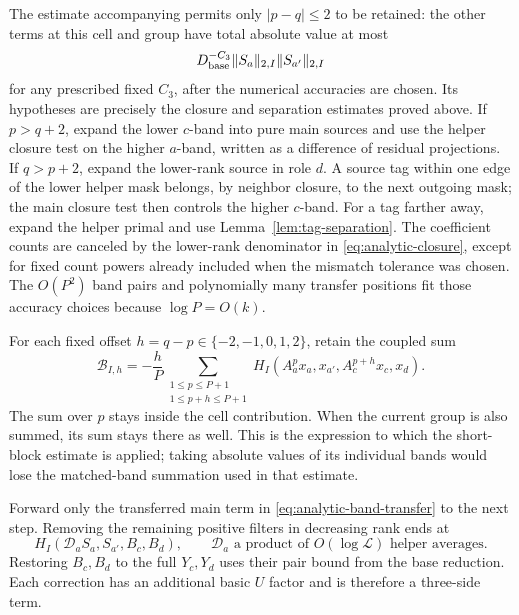 The estimate accompanying \cite[Lemma~6.9]{H} permits only
\(|p-q|\le2\) to be retained: the other terms at this cell and
group have total absolute value at most
\[
 D_{\rm base}^{-C_3}
       \lVert S_a\rVert_{2,I}\lVert S_{a'}\rVert_{2,I}
\]
for any prescribed fixed \(C_3\), after the numerical accuracies
are chosen.  Its hypotheses are precisely the closure and
separation estimates proved above.  If \(p>q+2\), expand the
lower \(c\)-band into pure main sources and use the helper
closure test on the higher \(a\)-band, written as a difference
of residual projections.  If \(q>p+2\), expand the lower-rank
source in role \(d\).  A source tag within one edge of the
lower helper mask belongs, by neighbor closure, to the next
outgoing mask; the main closure test then controls the higher
\(c\)-band.  For a tag farther away, expand the helper primal
and use Lemma~\ref{lem:tag-separation}.  The coefficient counts
are canceled by the lower-rank denominator in
\eqref{eq:analytic-closure}, except for fixed count powers
already included when the mismatch tolerance was chosen.
The \(O(P^2)\) band pairs and polynomially many transfer
positions fit those accuracy choices because \(\log P=O(k)\).

For each fixed offset \(h=q-p\in\{-2,-1,0,1,2\}\), retain the
coupled sum
\begin{equation}
 \mathcal B_{I,h}
    =-\frac hP
       \sum_{\substack{1\le p\le P+1\\1\le p+h\le P+1}}
          H_I(A_a^px_a,x_{a'},A_c^{p+h}x_c,x_d).
 \label{eq:analytic-retained-bands}
\end{equation}
The sum over \(p\) stays inside the cell contribution.  When the
current group is also summed, its sum stays there as well.
This is the expression to which the short-block estimate is
applied; taking absolute values of its individual bands would
lose the matched-band summation used in that estimate.

Forward only the transferred main term in
\eqref{eq:analytic-band-transfer} to the next step.  Removing
the remaining positive filters in decreasing rank ends at
\begin{equation}
 H_I(\mathcal D_aS_a,S_{a'},B_c,B_d),
 \qquad \mathcal D_a
   \text{ a product of }O(\log\mathcal L)\text{ helper averages}.
 \label{eq:analytic-transfer-main}
\end{equation}
Restoring \(B_c,B_d\) to the full \(Y_c,Y_d\) uses their pair
bound from the base reduction.  Each correction has an additional
basic \(U\) factor and is therefore a three-side term.

